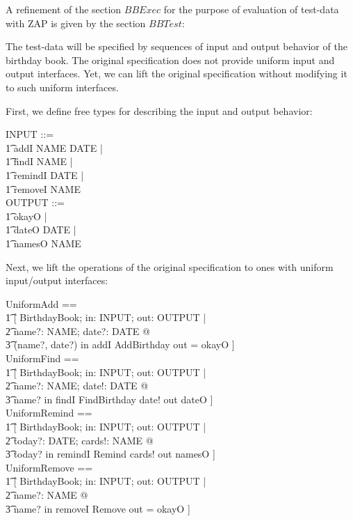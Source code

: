 \documentclass{article}
\begin{document}
A refinement of the section $BBExec$ for the purpose of evaluation of
test-data with ZAP is given by the section $BBTest$:

\begin{zdirectives}
\end{zdirectives}

The test-data will be specified by sequences of input and
output behavior of the birthday book. The original specification
does not provide uniform input and output interfaces. Yet, we can
lift the original specification without modifying it to such uniform
interfaces.

First, we define free types for describing the input and output behavior:

\begin{zed}
 INPUT ::= \\\t1
  addI \ldata  NAME \cross DATE \rdata |\\\t1
  findI \ldata NAME \rdata |\\\t1
  remindI \ldata DATE \rdata |\\\t1
  removeI \ldata NAME \rdata\\
 OUTPUT ::= \\\t1
  okayO |\\\t1
  dateO \ldata DATE \rdata |\\\t1
  namesO \ldata \power NAME \rdata\\
\end{zed}

Next, we lift the operations of the original specification to ones with
uniform input/output interfaces:

\begin{zed}
 UniformAdd == \\\t1
  [ \Delta BirthdayBook; in: INPUT; out: OUTPUT | \\\t2
     \exists name?: NAME; date?: DATE @ \\\t3
       (name?, date?) \mapsto in \in addI 
       \land AddBirthday 
       \land out = okayO ]  \\
 UniformFind == \\\t1
  [ \Delta BirthdayBook; in: INPUT; out: OUTPUT | \\\t2
     \exists name?: NAME; date!: DATE @ \\\t3
       name? \mapsto in \in findI 
       \land FindBirthday 
       \land date! \mapsto out \in dateO ]\\
 UniformRemind == \\\t1
  [ \Delta BirthdayBook; in: INPUT; out: OUTPUT | \\\t2
     \exists today?: DATE; cards!: \power NAME @ \\\t3
        today? \mapsto in \in remindI 
        \land Remind 
        \land cards! \mapsto out \in namesO ]\\
 UniformRemove == \\\t1
  [ \Delta BirthdayBook; in: INPUT; out: OUTPUT | \\\t2
     \exists name?: NAME @  \\\t3
       name? \mapsto in \in removeI 
       \land Remove 
       \land out = okayO ]\\
\end{zed}
\end{document}
